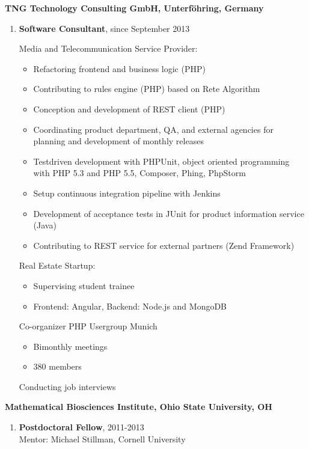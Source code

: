 \documentclass[10pt]{article}
\renewcommand{\section}[2]%
          {\pagebreak[2]\vspace{1.3\baselineskip}%
           \phantomsection\addcontentsline{toc}{section}{#1}%
           \hspace{-.05in}%
  	\marginpar{\raggedright \scshape #1} #2}
\newenvironment{outerlist}[1][\enskip\textbullet]%
          {\begin{enumerate}[#1]}{\end{enumerate}%
           \vspace{-.6\baselineskip}}
\begin{document}
  \section{} 
  \textbf{TNG Technology Consulting GmbH, Unterf\"ohring, Germany}
  \begin{outerlist}
  	\item[]
  	{\bf Software Consultant}, since September 2013

    Media and Telecommunication Service Provider:
    \begin{itemize}
      \item[] Refactoring frontend and business logic (PHP)
      \item[] Contributing to rules engine (PHP) based on Rete Algorithm
      \item[] Conception and development of REST client (PHP)
      \item[] Coordinating product department, QA, and external agencies for planning and development of monthly releases
      \item[] Testdriven development with PHPUnit, object oriented programming with PHP 5.3 and PHP 5.5, Composer, Phing, PhpStorm
      \item[] Setup continuous integration pipeline with Jenkins
      \item[] Development of acceptance tests in JUnit for product information service (Java)
      \item[] Contributing to REST service for external partners (Zend Framework)
    \end{itemize}

    Real Estate Startup:
      \begin{itemize}
      \item[] Supervising student trainee
      \item[] Frontend: Angular, Backend: Node.js and MongoDB
    \end{itemize}


    Co-organizer PHP Usergroup Munich
    \begin{itemize}
      \item[] Bimonthly meetings
      \item[] 380 members
    \end{itemize}

    Conducting job interviews\\

    \end{outerlist}

  \textbf{Mathematical Biosciences Institute, Ohio
  State University, OH}
  \begin{outerlist}
  	\item[]
  	{\bf Postdoctoral Fellow}, 2011-2013\\
  	Mentor: Michael Stillman, Cornell University
  	\\
  \end{outerlist}
  \begin{tabular*}{\textwidth}{c}
  \hline
  \end{tabular*}
\end{document}
